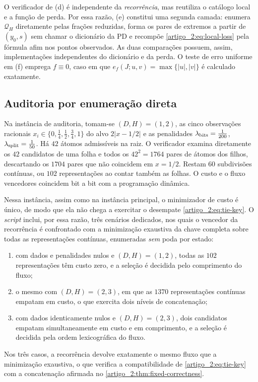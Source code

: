 O verificador de (d) é independente da \emph{recorrência}, mas reutiliza o
catálogo local e a função de perda. Por essa razão, (e) constitui uma segunda camada:
enumera $\mathcal Q_H$ diretamente pelas frações reduzidas, forma os pares
de extremos a partir de $(y_0,s)$ sem chamar o dicionário da PD e recompõe
\eqref{artigo_2:eq:local-loss} pela fórmula afim nos pontos observados. As duas
comparações possuem, assim, implementações independentes do dicionário e da
perda. O teste de erro uniforme em (f) emprega $f\equiv0$, caso em que
$e_f(J;u,v)=\max\{|u|,|v|\}$ é calculado exatamente.

\subsection{Auditoria por enumeração direta}

Na instância de auditoria, tomam-se $(D,H)=(1,2)$, as cinco observações
racionais $x_i\in\{0,\tfrac14,\tfrac12,\tfrac34,1\}$ do alvo $2|x-1/2|$ e as
penalidades $\lambda_{\rm bits}=\tfrac1{200}$,
$\lambda_{\rm split}=\tfrac1{50}$. Há $42$ átomos admissíveis na
raiz. O verificador examina diretamente os $42$ candidatos de uma folha e
todos os $42^2=1764$ pares de átomos dos filhos, descartando os $1704$ pares
que não coincidem em $x=1/2$. Restam $60$ subdivisões contínuas, ou $102$
representações ao contar também as folhas. O custo e o fluxo vencedores
coincidem bit a bit com a programação dinâmica.

Nessa instância, assim como na instância principal, o minimizador de custo é único,
de modo que ela não chega a exercitar o desempate \eqref{artigo_2:eq:tie-key}. O \emph{script}
inclui, por essa razão, três cenários dedicados, nos quais o vencedor da recorrência é
confrontado com a minimização exaustiva da chave completa sobre todas as
representações contínuas, enumeradas \emph{sem} poda por estado:
\begin{enumerate}[label=(\alph*),leftmargin=2em]
 \item com dados e penalidades nulos e $(D,H)=(1,2)$, todas as $102$
 representações têm custo zero, e a seleção é decidida pelo comprimento do
 fluxo;
 \item o mesmo com $(D,H)=(2,3)$, em que as $1370$ representações contínuas
 empatam em custo, o que exercita dois níveis de concatenação;
 \item com dados identicamente nulos e $(D,H)=(2,3)$, dois candidatos empatam
 simultaneamente em custo e em comprimento, e a seleção é decidida pela ordem
 lexicográfica do fluxo.
\end{enumerate}
Nos três casos, a recorrência devolve exatamente o mesmo fluxo que a
minimização exaustiva, o que verifica a compatibilidade de \eqref{artigo_2:eq:tie-key}
com a concatenação afirmada no \cref{artigo_2:thm:fixed-correctness}.

